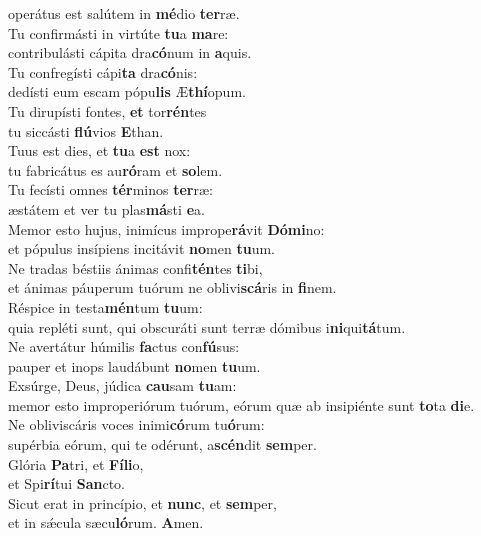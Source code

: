 \oddverse operátus est salútem in \textbf{mé}dio \textbf{ter}ræ.\\
\evenverse Tu confirmásti in virtúte \textbf{tu}a \textbf{ma}re:~\*\\
\evenverse contribulásti cápita dra\textbf{có}num in \textbf{a}quis.\\
\oddverse Tu confregísti cápi\textbf{ta} dra\textbf{có}nis:~\*\\
\oddverse dedísti eum escam pópu\textbf{lis} Æ\textbf{thí}opum.\\
\evenverse Tu dirupísti fontes, \textbf{et} tor\textbf{rén}tes~\*\\
\evenverse tu siccásti \textbf{flú}vios \textbf{E}than.\\
\oddverse Tuus est dies, et \textbf{tu}a \textbf{est} nox:~\*\\
\oddverse tu fabricátus es au\textbf{ró}ram et \textbf{so}lem.\\
\evenverse Tu fecísti omnes \textbf{tér}minos \textbf{ter}ræ:~\*\\
\evenverse æstátem et ver tu plas\textbf{má}sti \textbf{e}a.\\
\oddverse Memor esto hujus, inimícus imprope\textbf{rá}vit \textbf{Dó}\textbf{mi}no:~\*\\
\oddverse et pópulus insípiens incitávit \textbf{no}men \textbf{tu}um.\\
\evenverse Ne tradas béstiis ánimas confi\textbf{tén}tes \textbf{ti}bi,~\*\\
\evenverse et ánimas páuperum tuórum ne oblivi\textbf{scá}ris in \textbf{fi}nem.\\
\oddverse Réspice in testa\textbf{mén}tum \textbf{tu}um:~\*\\
\oddverse quia repléti sunt, qui obscuráti sunt terræ dómibus i\textbf{ni}qui\textbf{tá}tum.\\
\evenverse Ne avertátur húmilis \textbf{fa}ctus con\textbf{fú}sus:~\*\\
\evenverse pauper et inops laudábunt \textbf{no}men \textbf{tu}um.\\
\oddverse Exsúrge, Deus, júdica \textbf{cau}sam \textbf{tu}am:~\*\\
\oddverse memor esto improperiórum tuórum, eórum quæ ab insipiénte sunt \textbf{to}ta \textbf{di}e.\\
\evenverse Ne obliviscáris voces inimi\textbf{có}rum tu\textbf{ó}rum:~\*\\
\evenverse supérbia eórum, qui te odérunt, a\textbf{scén}dit \textbf{sem}per.\\
\oddverse Glória \textbf{Pa}tri, et \textbf{Fí}\textbf{li}o,~\*\\
\oddverse et Spi\textbf{rí}tui \textbf{San}cto.\\
\evenverse Sicut erat in princípio, et \textbf{nunc}, et \textbf{sem}per,~\*\\
\evenverse et in sǽcula sæcu\textbf{ló}rum. \textbf{A}men.\\

